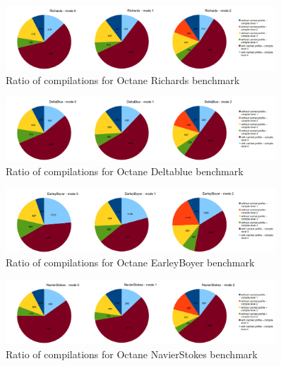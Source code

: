 \begin{figure}[ht]
  \begin{center}
    \centering
    \includegraphics[width=0.9\textwidth]{figures/richards_compilations.png}
    \caption{Ratio of compilations for Octane Richards benchmark}
    \label{f:richards_compilations}
  \end{center}
\end{figure}
\begin{figure}[ht]
  \begin{center}
    \centering
    \includegraphics[width=0.9\textwidth]{figures/deltablue_compilations.png}
    \caption{Ratio of compilations for Octane Deltablue benchmark}
    \label{f:deltablue_compilations}
  \end{center}
\end{figure}
\begin{figure}[ht]
  \begin{center}
    \centering
    \includegraphics[width=0.9\textwidth]{figures/earleyboyer_compilations.png}
    \caption{Ratio of compilations for Octane EarleyBoyer benchmark}
    \label{f:earleyboyer_compilations}
  \end{center}
\end{figure}
\begin{figure}[ht]
  \begin{center}
    \centering
    \includegraphics[width=0.9\textwidth]{figures/navierstokes_compilations.png}
    \caption{Ratio of compilations for Octane NavierStokes benchmark}
    \label{f:navierstokes_compilations}
  \end{center}
\end{figure}
